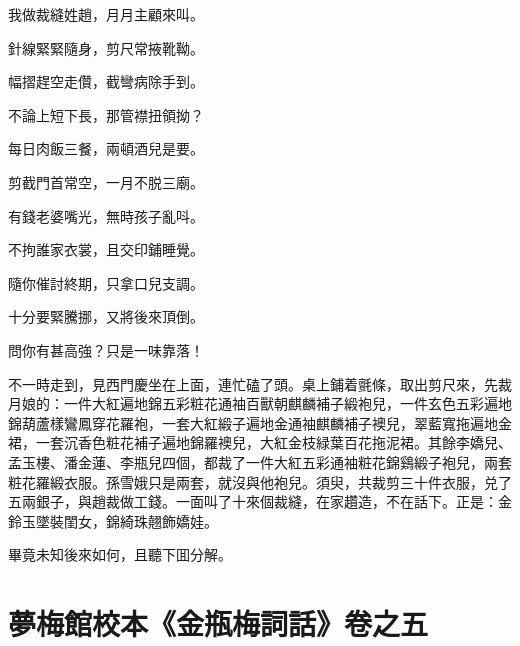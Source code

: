\begin{myquote}
我做裁縫姓趙，月月主顧來叫。

針線緊緊隨身，剪尺常掖靴靿。

幅摺趕空走儹，截彎病除手到。

不論上短下長，那管襟扭領拗？

每日肉飯三餐，兩頓酒兒是要。

剪截門首常空，一月不脱三廟。

有錢老婆嘴光，無時孩子亂呌。

不拘誰家衣裳，且交印鋪睡覺。

隨你催討終期，只拿口兒支調。

十分要緊騰挪，又將後來頂倒。

問你有甚高強？只是一味靠落！
\end{myquote}

不一時走到，見西門慶坐在上面，連忙磕了頭。桌上鋪着氈條，取出剪尺來，先裁月娘的：一件大紅遍地錦五彩粧花通袖百獸朝麒麟補子緞袍兒，一件玄色五彩遍地錦葫蘆樣鸞鳳穿花羅袍，一套大紅緞子遍地金通袖麒麟補子襖兒，翠藍寬拖遍地金裙，一套沉香色粧花補子遍地錦羅襖兒，大紅金枝緑葉百花拖泥裙。其餘李嬌兒、孟玉樓、潘金蓮、李瓶兒四個，都裁了一件大紅五彩通袖粧花錦鷄緞子袍兒，兩套粧花羅緞衣服。孫雪娥只是兩套，就沒與他袍兒。須臾，共裁剪三十件衣服，兑了五兩銀子，與趙裁做工錢。一面叫了十來個裁縫，在家趲造，不在話下。正是：金鈴玉墜裝閨女，錦綺珠翹飾嬌娃。

畢竟未知後來如何，且聽下囬分解。

\part*{夢梅館校本《金瓶梅詞話》卷之五}

